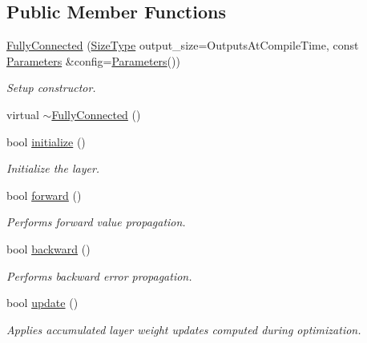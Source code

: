 \subsection*{Public Member Functions}
\begin{DoxyCompactItemize}
\item 
\hyperlink{classffnn_1_1layer_1_1_fully_connected_a7cb4ce3e1ed29c4c7f7f4ef8f9ee9259}{Fully\-Connected} (\hyperlink{classffnn_1_1layer_1_1_fully_connected_ae1b5e64828482a4c3eea0e2b0ba3f826}{Size\-Type} output\-\_\-size=Outputs\-At\-Compile\-Time, const \hyperlink{structffnn_1_1layer_1_1_fully_connected_1_1_parameters}{Parameters} \&config=\hyperlink{structffnn_1_1layer_1_1_fully_connected_1_1_parameters}{Parameters}())
\begin{DoxyCompactList}\small\item\em Setup constructor. \end{DoxyCompactList}\item 
virtual \hyperlink{classffnn_1_1layer_1_1_fully_connected_a0973b3b3d33d5e3597f440d907e709f7}{$\sim$\-Fully\-Connected} ()
\item 
bool \hyperlink{classffnn_1_1layer_1_1_fully_connected_aec414194202f845b866b0e8b2a51235c}{initialize} ()
\begin{DoxyCompactList}\small\item\em Initialize the layer. \end{DoxyCompactList}\item 
bool \hyperlink{classffnn_1_1layer_1_1_fully_connected_ac49087ab2d66019f2d0244c76987fa50}{forward} ()
\begin{DoxyCompactList}\small\item\em Performs forward value propagation. \end{DoxyCompactList}\item 
bool \hyperlink{classffnn_1_1layer_1_1_fully_connected_afd5c1a006cf33a47cb7e2a982fe4cd6d}{backward} ()
\begin{DoxyCompactList}\small\item\em Performs backward error propagation. \end{DoxyCompactList}\item 
bool \hyperlink{classffnn_1_1layer_1_1_fully_connected_a3194dde96feea7d008cc0c27f30cc805}{update} ()
\begin{DoxyCompactList}\small\item\em Applies accumulated layer weight updates computed during optimization. \end{DoxyCompactList}\item 

\end{DoxyCompactItemize}
